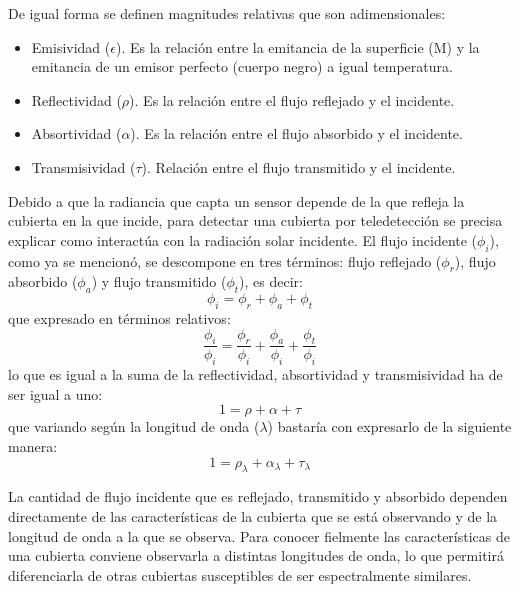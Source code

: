 De igual forma se definen magnitudes relativas que son adimensionales:

\begin{itemize}
	\item Emisividad ($\epsilon$). Es la relación entre la emitancia de la superficie (M) y la emitancia de un emisor perfecto (cuerpo negro) a igual temperatura.
	\item Reflectividad ($\rho$). Es la relación entre el flujo reflejado y el incidente.
	\item Absortividad ($\alpha$). Es la relación entre el flujo absorbido y el incidente.
	\item Transmisividad ($\tau$). Relación entre el flujo transmitido y el incidente.
\end{itemize}

Debido a que la radiancia que capta un sensor depende de la que refleja la cubierta en la que incide, para detectar una cubierta por teledetección se precisa explicar como interactúa con la radiación solar incidente. El flujo incidente ($\phi_{i}$), como ya se mencionó, se descompone en tres términos: flujo reflejado ($\phi_{r}$), flujo absorbido ($\phi_{a}$) y flujo transmitido ($\phi_{t}$), es decir:
\begin{equation}
	\phi_{i}=\phi_{r}+\phi_{a}+\phi_{t}
	\label{eq:flujoinc}
\end{equation}
que expresado en términos relativos:
\begin{equation}
	\frac{\phi_{i}}{\phi_{i}}=\frac{\phi_{r}}{\phi_{i}}+\frac{\phi_{a}}{\phi_{i}}+\frac{\phi_{t}}{\phi_{i}}
	\label{eq:flujorel}
\end{equation}
lo que es igual a la suma de la reflectividad, absortividad y transmisividad ha de ser igual a uno:
\begin{equation}
	1=\rho+\alpha+\tau
	\label{eq:flujo}
\end{equation}
que variando según la longitud de onda ($\lambda$) bastaría con expresarlo de la siguiente manera:
\begin{equation}
	1=\rho_{\lambda}+\alpha_{\lambda}+\tau_{\lambda}
	\label{eq:flujolong}
\end{equation}

La cantidad de flujo incidente que es reflejado, transmitido y absorbido dependen directamente de las características de la cubierta que se está observando y de la longitud de onda a la que se observa. Para conocer fielmente las características de una cubierta conviene observarla a distintas longitudes de onda, lo que permitirá diferenciarla de otras cubiertas susceptibles de ser espectralmente similares.\Sep

